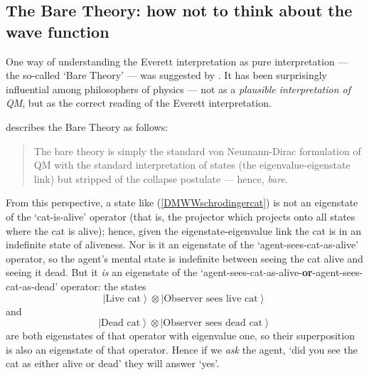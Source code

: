 \documentclass[12pt]{article}
\newcommand{\be}{\begin{equation}}
\newcommand{\ee}{\end{equation}}
\newcommand{\ket}[1]{\ensuremath{\left|  #1 \right\rangle}}
\newcommand{\tpk}[2]{\ensuremath{\ket{#1}\!\otimes\!\ket{#2}}}
\begin{document}
\subsection{The Bare Theory: how not to think about the wave function}\label{DMWWbaretheory}

One way of understanding the Everett interpretation as pure interpretation --- the so-called `Bare Theory' --- was suggested by . It has been surprisingly influential among philosophers of physics --- not as a \emph{plausible interpretation of QM}, but as the correct reading of the Everett interpretation. 

 describes the Bare Theory as follows:
\begin{quote}
The bare theory is simply the standard von Neumann-Dirac formulation of QM with the standard interpretation of states (the eigenvalue-eigenstate link) but stripped of the collapse postulate --- hence, \emph{bare}.
\end{quote}
From this perspective, a state like (\ref{DMWWschrodingercat}) is not an eigenstate of the `cat-is-alive' operator (that is, the projector which projects onto all states where the cat is alive); hence, given the eigenstate-eigenvalue link the cat is in an indefinite state of aliveness. Nor is it an eigenstate of the `agent-sees-cat-as-alive' operator, so the agent's mental state is indefinite between seeing the cat alive and seeing it dead. But it \emph{is} an eigenstate of the `agent-sees-cat-as-alive-\textbf{or}-agent-sees-cat-as-dead' operator: the states
\be
\tpk{\mathrm{\mbox{Live cat}}}{\mathrm{\mbox{Observer sees live cat}}}
\ee
and
\be
\tpk{\mathrm{\mbox{Dead cat}}}{\mathrm{\mbox{Observer sees dead cat}}}
\ee
are both eigenstates of that operator with eigenvalue one, so their superposition is also an eigenstate of that operator. Hence if we \emph{ask} the agent, `did you see the cat as either alive or dead' they will answer `yes'. 
\end{document}
